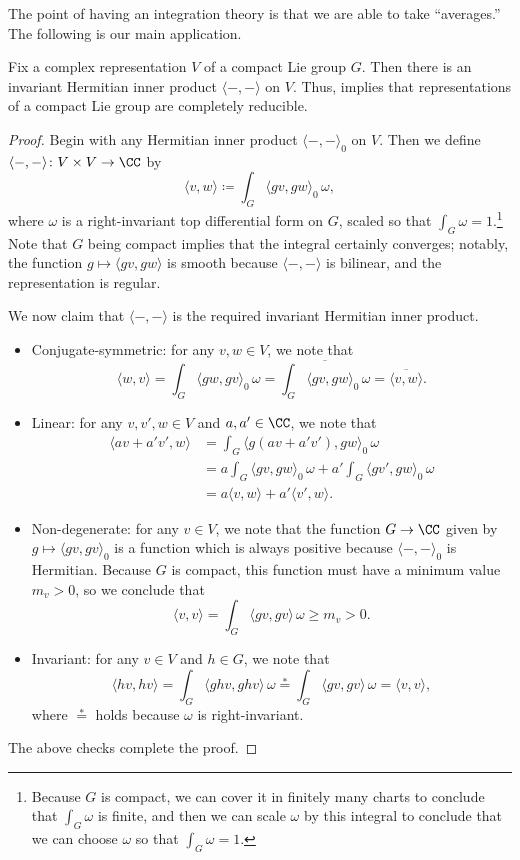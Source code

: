\documentclass[../notes.tex]{subfiles}
\begin{document}
The point of having an integration theory is that we are able to take ``averages.'' The following is our main application.
\begin{proposition} \label{prop:compact-reduces}
	Fix a complex representation $V$ of a compact Lie group $G$. Then there is an invariant Hermitian inner product $\langle-,-\rangle$ on $V$. Thus,  implies that representations of a compact Lie group are completely reducible.
\end{proposition}
\begin{proof}
	Begin with any Hermitian inner product $\langle-,-\rangle_0$ on $V$. Then we define $\langle-,-\rangle\colon V\times V\to\CC$ by
	\[\langle v,w\rangle\coloneqq\int_G\langle gv,gw\rangle_0\,\omega,\]
	where $\omega$ is a right-invariant top differential form on $G$, scaled so that $\int_G\omega=1$.\footnote{Because $G$ is compact, we can cover it in finitely many charts to conclude that $\int_G\omega$ is finite, and then we can scale $\omega$ by this integral to conclude that we can choose $\omega$ so that $\int_G\omega=1$.} Note that $G$ being compact implies that the integral certainly converges; notably, the function $g\mapsto\langle gv,gw\rangle$ is smooth because $\langle-,-\rangle$ is bilinear, and the representation is regular.

	We now claim that $\langle-,-\rangle$ is the required invariant Hermitian inner product.
	\begin{itemize}
		\item Conjugate-symmetric: for any $v,w\in V$, we note that
		\[\langle w,v\rangle=\int_G\langle gw,gv\rangle_0\,\omega=\overline{\int_G\langle gv,gw\rangle_0\,\omega}=\overline{\langle v,w\rangle}.\]
		\item Linear: for any $v,v',w\in V$ and $a,a'\in\CC$, we note that
		\begin{align*}
			\langle av+a'v',w\rangle &= \int_G\langle g(av+a'v'),gw\rangle_0\,\omega \\
			&= a\int_G\langle gv,gw\rangle_0\,\omega+a'\int_G\langle gv',gw\rangle_0\,\omega \\
			&= a\langle v,w\rangle+a'\langle v',w\rangle.
		\end{align*}
		\item Non-degenerate: for any $v\in V$, we note that the function $G\to\CC$ given by $g\mapsto\langle gv,gv\rangle_0$ is a function which is always positive because $\langle-,-\rangle_0$ is Hermitian. Because $G$ is compact, this function must have a minimum value $m_v>0$, so we conclude that
		\[\langle v,v\rangle=\int_G\langle gv,gv\rangle\,\omega\ge m_v>0.\]
		\item Invariant: for any $v\in V$ and $h\in G$, we note that
		\[\langle hv,hv\rangle=\int_G\langle ghv,ghv\rangle\,\omega\stackrel*=\int_G\langle gv,gv\rangle\,\omega=\langle v,v\rangle,\]
		where $\stackrel*=$ holds because $\omega$ is right-invariant.
	\end{itemize}
	The above checks complete the proof.
\end{proof}
\end{document}
